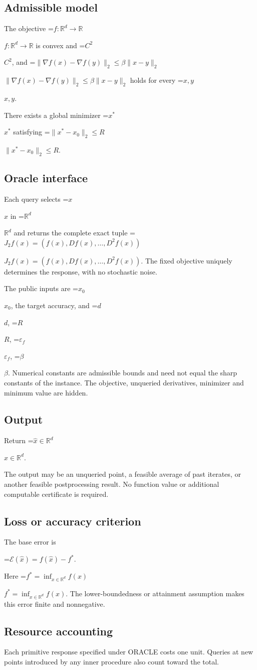 \documentclass[10pt,a4paper]{article}
\newcommand{\AtlasMath}[1]{\par\begingroup\centering\setbox0=\hbox{$\displaystyle #1$}\ifdim\wd0>1.4\linewidth\typeout{ATLAS WIDE FORMULA: \the\wd0}\fi\ifdim\wd0>\linewidth\resizebox{\linewidth}{!}{\box0}\else\box0\fi\par\endgroup}
\newcommand{\AtlasInlineMath}[1]{\begingroup\setbox0=\hbox{$#1$}\ifdim\wd0>.4\linewidth\endgroup\AtlasMath{#1}\else\endgroup$#1$\fi}
\begin{document}
\subsection{Admissible model}
The objective \AtlasInlineMath{f:\mathbb{R}^d\to\mathbb{R}} is convex and \AtlasInlineMath{C^2}, and \AtlasInlineMath{\|\nabla f(x)-\nabla f(y)\|_2\le\beta\|x-y\|_2} holds for every \AtlasInlineMath{x,y}.

There exists a global minimizer \AtlasInlineMath{x^*} satisfying \AtlasInlineMath{\|x^*-x_0\|_2\le R}.

\subsection{Oracle interface}
Each query selects \AtlasInlineMath{x} in \AtlasInlineMath{\mathbb{R}^d} and returns the complete exact tuple \AtlasInlineMath{J_{2}f(x)=(f(x),Df(x),\ldots,D^{2}f(x))}. The fixed objective uniquely determines the response, with no stochastic noise.

The public inputs are \AtlasInlineMath{x_0}, the target accuracy, and \AtlasInlineMath{d}, \AtlasInlineMath{R}, \AtlasInlineMath{\varepsilon_f}, \AtlasInlineMath{\beta}. Numerical constants are admissible bounds and need not equal the sharp constants of the instance. The objective, unqueried derivatives, minimizer and minimum value are hidden.

\subsection{Output}
Return \AtlasInlineMath{\widehat{x}\in \mathbb{R}^d}.

The output may be an unqueried point, a feasible average of past iterates, or another feasible postprocessing result. No function value or additional computable certificate is required.

\subsection{Loss or accuracy criterion}
The base error is


\AtlasMath{\mathcal{E}(\widehat{x})=f(\widehat{x})-f^*.}


Here \AtlasInlineMath{f^*=\inf_{x\in \mathbb{R}^d}f(x)}. The lower-boundedness or attainment assumption makes this error finite and nonnegative.

\subsection{Resource accounting}
Each primitive response specified under ORACLE costs one unit. Queries at new points introduced by any inner procedure also count toward the total.
\end{document}
